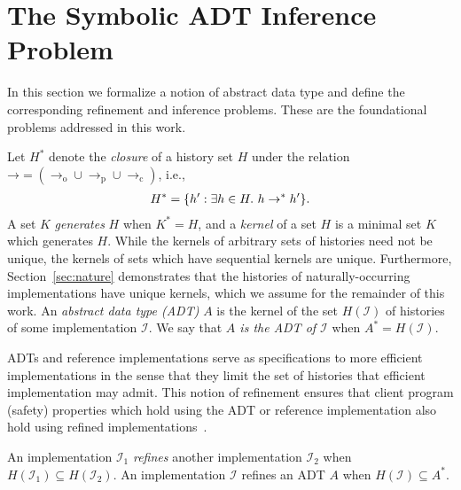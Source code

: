 \section{The Symbolic ADT Inference Problem}
\label{sec:inference}

In this section we formalize a notion of abstract data type and define the
corresponding refinement and inference problems. These are the foundational
problems addressed in this work.

Let $H^*$ denote the \emph{closure} of a history set $H$ under the relation
$\mathord\to = (\to_\mathrm{o} \cup \to_\mathrm{p} \cup \to_\mathrm{c})$, i.e.,
\begin{align*}
  H^* = {\{{ h' : \exists h \in H.\ h \to^\ast h' }\}}.
\end{align*}
A set $K$ \emph{generates} $H$ when $K^* = H$, and a \emph{kernel} of a set $H$
is a minimal set $K$ which generates $H$. While the kernels of arbitrary sets of
histories need not be unique, the kernels of sets which have sequential kernels
are unique. Furthermore, Section~\ref{sec:nature} demonstrates that the
histories of naturally-occurring implementations have unique kernels, which we
assume for the remainder of this work. An \emph{abstract data type (ADT)} $A$ is
the kernel of the set $H(\mathcal{I})$  of histories of some implementation
$\mathcal{I}$. We say that \emph{$A$ is the ADT of $\mathcal{I}$} when $A^* =
H(\mathcal{I})$.

ADTs and reference implementations serve as specifications to more efficient
implementations in the sense that they limit the set of histories that efficient
implementation may admit. This notion of refinement ensures that client program
(safety) properties which hold using the ADT or reference implementation also
hold using refined implementations~\cite{conf/popl/BouajjaniEEH15}.

\begin{definition}

  An implementation $\mathcal{I}_1$ \emph{refines} another implementation
  $\mathcal{I}_2$ when $H(\mathcal{I}_1) \subseteq H(\mathcal{I}_2)$. An
  implementation $\mathcal{I}$ refines an ADT $A$ when $H(\mathcal{I})
  \subseteq A^*$.

\end{definition}

